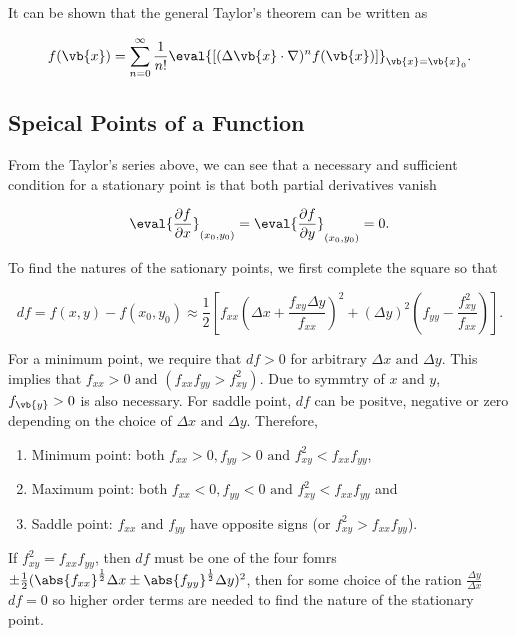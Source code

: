 \documentclass[english,a4paper,12pt]{report}
\begin{document}
It can be shown that the general Taylor's theorem can be written as 

\begin{equation}
    f(\vb{x} ) = \sum_{n=0}^{\infty} \frac{1}{n!} \eval{\left[ (\Delta \vb{x} \cdot \nabla )^{n} f(\vb{x} ) \right]}_{\vb{x} = \vb{x} _{0}}  .
\end{equation}

\subsection{Speical Points of a Function}

From the Taylor's series above, we can see that a necessary and sufficient condition for a stationary point is that both partial derivatives vanish

\begin{equation}
    \eval{\frac{\partial f}{\partial x}}_{(x_0 ,y_0 )} = \eval{\frac{\partial f}{\partial y}}_{(x_0 ,y_0 )} =0.
\end{equation}

To find the natures of the sationary points, we first complete the square so that 

\begin{equation}
    df = f(x,y) - f(x_0 , y_0 ) \approx  \frac{1}{2} \left[ f_{xx}\left( \Delta x+ \frac{f_{xy}\Delta y }{f_{xx} }  \right)^2 + (\Delta y)^2\left( f_{yy} - \frac{f_{xy}^2 }{f_{xx} }   \right)  \right].
\end{equation}

For a minimum point, we require that \(df>0\) for arbitrary \(\Delta x \text { and } \Delta y\). This implies that \(f_{xx} >0 \text { and } \left( f_{xx}f_{yy} > f_{xy}^2 \right)\). Due to symmtry of \(x \text { and } y\), \(f_{\vb{y} } >0\) is also necessary. For saddle point, \(df\) can be positve, negative or zero depending on the choice of \(\Delta x \text { and } \Delta y\). Therefore,

\begin{enumerate}
    \item Minimum point: both \(f_{xx} > 0, f_{yy} > 0 \text { and } f_{xy}^2 < f_{xx}f_{yy}\),
    \item Maximum point: both \(f_{xx} < 0, f_{yy} < 0 \text { and } f_{xy}^2 < f_{xx}f_{yy}\) and
    \item Saddle point: \(f_{xx} \text { and } f_{yy}\) have opposite signs (or \(f_{xy}^2 > f_{xx}f_{yy}\)). 
\end{enumerate}

If \(f_{xy}^2 = f_{xx}f_{yy}\), then \(df\) must be one of the four fomrs \(\pm \frac{1}{2} (\abs{f_{xx} }^{\frac{1}{2} } \Delta x \pm \abs{f_{yy} }^{\frac{1}{2} }\Delta y)^2\), then for some choice of the ration \(\frac{\Delta y}{\Delta x}\) \(df = 0\) so higher order terms are needed to find the nature of the stationary point. 
\end{document}
